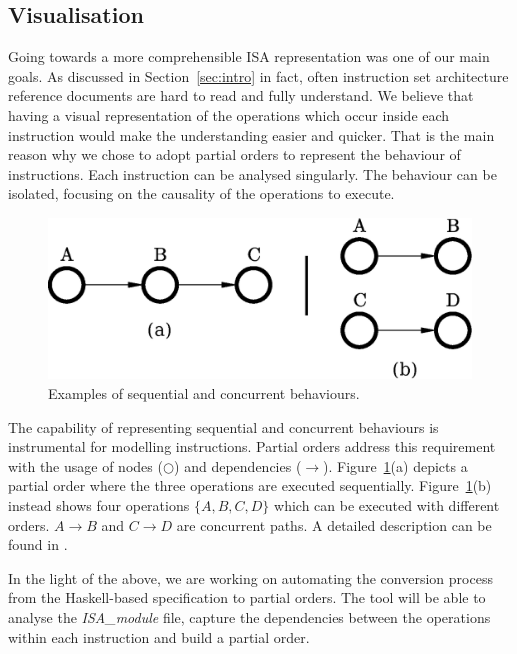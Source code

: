 \documentclass[conference]{IEEEtran}
\begin{document}
\subsection{Visualisation}
\label{sec:read}
Going towards a more comprehensible ISA representation was one of our main goals. As discussed in
Section~\ref{sec:intro} in fact, often instruction set architecture reference documents are hard to
read and fully understand. We believe that having a visual representation of the operations
which occur inside each instruction would make the understanding easier and quicker. That is
the main reason why we chose to adopt partial orders to represent the behaviour of
instructions. Each instruction can be analysed singularly. The behaviour can be isolated,
focusing on the causality of the operations to execute.

\begin{figure}[ht!]
\begin{center}
	\includegraphics[scale=0.5]{IMG/pos.eps}
	\caption{Examples of sequential and concurrent behaviours.}
	\label{fig:pos}
\end{center}
\end{figure}

The capability of representing sequential and concurrent behaviours is instrumental for
modelling instructions. Partial orders address this requirement with the usage of nodes
($\bigcirc$) and dependencies ($\rightarrow$). Figure~\ref{fig:pos}(a) depicts a partial order
where the three operations are executed sequentially. Figure~\ref{fig:pos}(b) instead shows
four operations $\lbrace A,B,C,D \rbrace$ which can be executed with different orders. 
$A \rightarrow B$ and $C \rightarrow D$ are concurrent paths. A detailed
description can be found in \cite{andreyPhd}.

In the light of the above, we are working on automating the conversion process from the
Haskell-based specification to partial orders. The tool will be able to analyse the
\textit{ISA\_module} file, capture the dependencies between the operations within each
instruction and build a partial order. 
\end{document}
